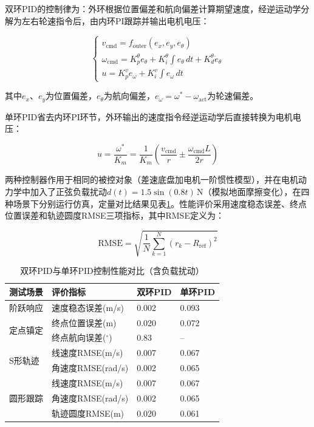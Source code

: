 {{    双环PID的控制律为：外环根据位置偏差和航向偏差计算期望速度，经逆运动学分解为左右轮速指令后，由内环PI跟踪并输出电机电压：

    \begin{equation}
    \begin{cases}
    v_{\mathrm{cmd}} = f_{\mathrm{outer}}(e_x, e_y, e_\theta) \\
    \omega_{\mathrm{cmd}} = K_p^\theta e_\theta + K_i^\theta \int e_\theta\,dt + K_d^\theta \dot{e}_\theta \\
    u = K_p^v e_\omega + K_i^v \int e_\omega\,dt
    \end{cases}
    \label{eq:dual_loop}
    \end{equation}

    其中$e_x$、$e_y$为位置偏差，$e_\theta$为航向偏差，$e_\omega = \omega^* - \omega_{\mathrm{act}}$为轮速偏差。

    单环PID省去内环PI环节，外环输出的速度指令经逆运动学后直接转换为电机电压：

    \begin{equation}
    u = \frac{\omega^*}{K_m} = \frac{1}{K_m}\left(\frac{v_{\mathrm{cmd}}}{r} \pm \frac{\omega_{\mathrm{cmd}} L}{2r}\right)
    \label{eq:single_loop}
    \end{equation}

    两种控制器作用于相同的被控对象（差速底盘加电机一阶惯性模型），并在电机动力学中加入了正弦负载扰动$d(t)=1.5\sin(0.8t)\,\mathrm{N}$（模拟地面摩擦变化），在四种场景下分别运行仿真，定量对比结果见表\ref{tab:dual_vs_single}。性能评价采用速度稳态误差、终点位置误差和轨迹圆度RMSE三项指标，其中RMSE定义为：

    \begin{equation}
    \mathrm{RMSE} = \sqrt{\frac{1}{N}\sum_{k=1}^{N}\left(r_k - R_{\mathrm{ref}}\right)^2}
    \label{eq:rmse}
    \end{equation}

    \begin{table}[htbp]
    \wuhao
    \centering
    \caption{双环PID与单环PID控制性能对比（含负载扰动）}
    \label{tab:dual_vs_single}
    \begin{tabular}{p{2cm}p{2.5cm}p{2.5cm}p{2.5cm}}
    \toprule
    测试场景 & 评价指标 & 双环PID & 单环PID \\
    \midrule
    阶跃响应 & 速度稳态误差(m/s) & 0.002 & 0.093 \\
    \multirow{2}{*}{定点镇定} & 终点位置误差(m) & 0.020 & 0.072 \\
    & 终点航向误差($^\circ$) & 0.83 & -- \\
    \multirow{2}{*}{S形轨迹} & 线速度RMSE(m/s) & 0.007 & 0.067 \\
    & 角速度RMSE(rad/s) & 0.002 & 0.065 \\
    \multirow{3}{*}{圆形跟踪} & 线速度RMSE(m/s) & 0.007 & 0.067 \\
    & 角速度RMSE(rad/s) & 0.002 & 0.065 \\
    & 轨迹圆度RMSE(m) & 0.020 & 0.061 \\
    \bottomrule
    \end{tabular}
    \end{table}

}}
